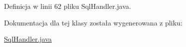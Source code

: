 Definicja w linii 62 pliku Sql\+Handler.\+java.



Dokumentacja dla tej klasy została wygenerowana z pliku\+:\begin{DoxyCompactItemize}
\item 
\hyperlink{_sql_handler_8java}{Sql\+Handler.\+java}\end{DoxyCompactItemize}
